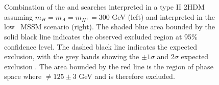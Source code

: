 \begin{figure}[h!]
\begin{center}
\caption{Combination of the \AtoZhtolltautau and \Htohhtobbtautau searches
interpreted in a type II 2HDM assuming $m_{H} = m_{A} = m_{H^{+}} = 300$ GeV (left) and interpreted
in the low \tanb ~MSSM scenario (right). The shaded blue area bounded by
the solid black line indicates the observed excluded region at 95\% confidence level.
The dashed black line indicates the expected exclusion, with the grey bands showing
the $\pm 1\sigma$ and $2\sigma$ expected exclusion \cite{CMS-HIG-14-034}. The area
bounded by the red line is the region of phase space where \mh $\neq 125 \pm 3$ 
GeV and is therefore excluded.}
\label{fig:HhhAZhMSSM2HDM}
\end{center}
\end{figure}
